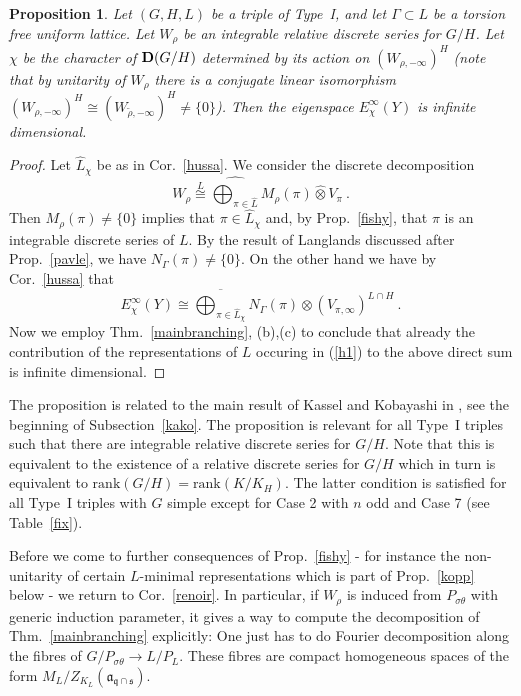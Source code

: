 \documentclass[10]{amsart}
\newtheorem{pro}[thm]{Proposition}
\theoremstyle{remark}
\theoremstyle{definition}
\numberwithin{equation}{section}
\newcommand{\rank}{\text{rank}}
\newcommand{\gt}{\theta}
\newcommand{\be}{\begin{equation}}
\begin{document}
{\begin{pro}\label{horn}
Let $(G,H,L)$ be a triple of Type~I, and let $\Gamma\subset L$ be a torsion free uniform lattice. Let $W_\rho$ be an integrable relative discrete series for $G/H$.
Let $\chi$ be the character of ${\bf D}(G/H)$ determined by its action on $(W_{\rho,-\infty})^H$ (note that by unitarity of $W_\rho$ there is a conjugate linear isomorphism $(W_{\rho,-\infty})^H\cong (W_{\tilde\rho,-\infty})^H\ne\{0\}$). Then the eigenspace $E^\infty_\chi(Y)$ is infinite dimensional.
\end{pro}

\begin{proof} Let $\widehat L_\chi$ be as in Cor.~\ref{hussa}. We consider the discrete decomposition
\be\label{h1}W_{\rho}\stackrel{L}{\cong}\widehat{\bigoplus_{\pi\in\widehat L}} M_{\rho}(\pi)\hat\otimes V_\pi\  . \end{equation}
Then $ M_{\rho}(\pi)\ne\{0\}$ implies that $\pi\in\widehat L_\chi$ and, by Prop.~\ref{fishy}, that $\pi$ is an integrable discrete series of $L$.
By the result of Langlands discussed after Prop.~\ref{pavle}, we have $N_\Gamma(\pi)\ne\{0\}$. 
On the other hand we have by Cor.~\ref{hussa} that
$${E}_\chi^{\infty}(Y)\cong \overline{\bigoplus_{\pi\in\widehat L_\chi}} N_\Gamma(\pi)\otimes (V_{\pi,\infty})^{L\cap H}\ .$$
Now we employ Thm.~\ref{mainbranching}, (b),(c) to conclude that already the contribution of the representations of $L$ occuring in (\ref{h1}) to the above direct sum is infinite dimensional.
\end{proof}
The proposition is related to the main result of 
Kassel and Kobayashi in \cite{KK2}, see the beginning of Subsection~\ref{kako}.
The proposition is relevant for all Type~I triples such that there are integrable relative discrete series for $G/H$. Note that this is equivalent to the existence of a relative discrete series
for $G/H$ which in turn is equivalent  to $\rank(G/H)=\rank (K/K_H)$. The latter condition is satisfied for all Type~I triples with $G$ simple except for Case 2 with $n$ odd and Case 7 (see Table~\ref{fix}).


Before we come to further consequences of Prop.~\ref{fishy} - for instance the  non-unitarity of certain $L$-minimal representations which is part of Prop.~\ref{kopp} below -
we return to Cor.~\ref{renoir}. In particular, if $W_\rho$ is induced from $P_{\sigma\gt}$ with generic induction parameter, it gives a way to compute the decomposition of 
Thm.~\ref{mainbranching} explicitly: One just has to do Fourier decomposition along the fibres of $G/P_{\sigma\theta}\rightarrow L/P_L$. These fibres are compact homogeneous
spaces of the form $M_L/Z_{K_L}({\mathfrak a}_{{\mathfrak q}\cap{\mathfrak s}})$.

}
\end{document}
